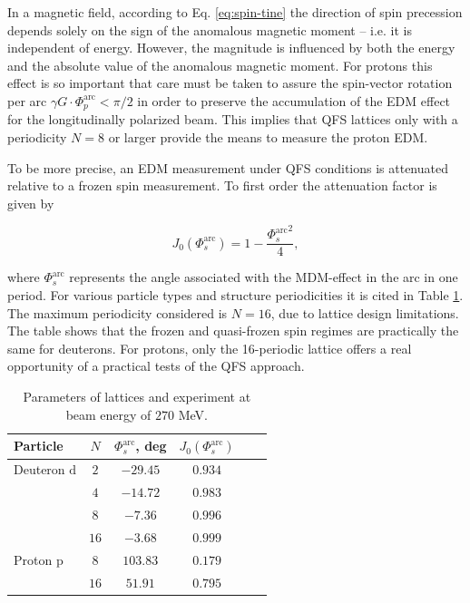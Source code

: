 \documentclass[submitting]{nst}
\begin{document}
\par In a magnetic field, according to Eq. \ref{eq:spin-tine} the direction of spin precession depends solely on the sign of the anomalous magnetic moment -- i.e. it is independent of energy. However, the magnitude is influenced by both the energy and the absolute value of the anomalous magnetic moment. For protons this effect is so important that care must be taken to assure the spin-vector rotation per arc $\gamma G \cdot \Phi_{p}^{\text{arc}} < \pi/2$ in order to preserve the accumulation of the EDM effect for the longitudinally polarized beam. This implies that QFS lattices only with a periodicity $N=8$ or larger provide the means to measure the proton EDM.

\par To be more precise, an EDM measurement under QFS conditions is attenuated relative to a frozen spin measurement. To first order the attenuation factor is given by \cite{consider}

\begin{equation}
	J_{0}(\Phi_s^{\textrm{arc}})=1-\frac{{\Phi_s^{\textrm{arc}}}^2}{4},
	\label{eq:edm}
\end{equation}

\noindent where $\Phi_s^{\textrm{arc}}$ represents the angle associated with the MDM-effect in the arc in one period. For various particle types and structure periodicities it is cited in Table \ref{tab:edm}. The maximum periodicity considered is $N=16$, due to lattice design limitations. The table shows that the frozen and quasi-frozen spin regimes are practically the same for deuterons. For protons, only the 16-periodic lattice offers a real opportunity of a practical tests of the QFS approach.

\begin{table}[!htb]
	\caption{Parameters of lattices and experiment at beam energy of $270$ MeV.}
	\label{tab:edm}
	\begin{tabular*}{8cm} {@{\extracolsep{\fill} } lccccc}
		\toprule
		Particle & $N$ & $\Phi_s^{\textrm{arc}}$, deg & $J_{0}(\Phi_s^{\textrm{arc}})$ \\
		\midrule
		Deuteron $\text{d}$ & $2$   & $-29.45$ & $0.934$ \\
				 			& $4$   & $-14.72$ & $0.983$ \\
				 			& $8$   & $-7.36$ & $0.996$ \\
				 			& $16$   & $-3.68$ & $0.999$ \\
		Proton $\text{p}$ & $8$  &  $103.83$	   & $0.179$\\
						  & $16$  &  $51.91$	   & $0.795$\\
		\bottomrule
	\end{tabular*}
\end{table}
\end{document}
